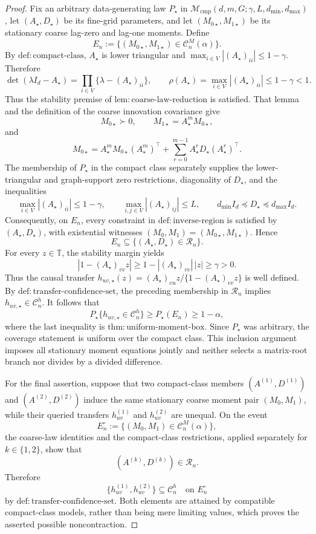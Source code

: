 \documentclass{article}
\begin{document}
\begin{proof}
Fix an arbitrary data-generating law \(P_\star\) in
\(\mathcal M_{\mathrm{cmp}}(d,m,G;\gamma,L,d_{\min},d_{\max})\), let
\((A_\star,D_\star)\) be its fine-grid parameters, and let
\((M_{0\star},M_{1\star})\) be its stationary coarse lag-zero and lag-one
moments.  Define
\[
 E_n:=\{(M_{0\star},M_{1\star})\in\mathcal C_n^M(\alpha)\}.
\]
By \(\mathrm{def{:}compact\mbox{-}class}\), \(A_\star\) is lower
triangular and
\(\max_{i\in V}|(A_\star)_{ii}|\leq 1-\gamma\).  Therefore
\[
 \det(\lambda I_d-A_\star)
 =\prod_{i\in V}\{\lambda-(A_\star)_{ii}\},
 \qquad
 \rho(A_\star)=\max_{i\in V}|(A_\star)_{ii}|
 \leq 1-\gamma<1.
\]
Thus the stability premise of
\(\mathrm{lem{:}coarse\mbox{-}law\mbox{-}reduction}\) is satisfied.
That lemma and the definition of the coarse innovation covariance give
\[
 M_{0\star}\succ0,
 \qquad
 M_{1\star}=A_\star^mM_{0\star},
\]
and
\[
 M_{0\star}
 =A_\star^mM_{0\star}(A_\star^m)^\top
  +\sum_{r=0}^{m-1}A_\star^rD_\star(A_\star^r)^\top.
\]
The membership of \(P_\star\) in the compact class separately supplies
the lower-triangular and graph-support zero restrictions, diagonality of
\(D_\star\), and the inequalities
\[
 \max_{i\in V}|(A_\star)_{ii}|\leq1-\gamma,
 \qquad
 \max_{i,j\in V}|(A_\star)_{ij}|\leq L,
 \qquad
 d_{\min}I_d\preceq D_\star\preceq d_{\max}I_d.
\]
Consequently, on \(E_n\), every constraint in
\(\mathrm{def{:}inverse\mbox{-}region}\) is satisfied by
\((A_\star,D_\star)\), with existential witnesses
\((M_0,M_1)=(M_{0\star},M_{1\star})\).  Hence
\[
 E_n\subseteq\{(A_\star,D_\star)\in\mathcal R_n\}.
\]
For every \(z\in\mathbb T\), the stability margin yields
\[
 |1-(A_\star)_{vv}z|
 \geq 1-|(A_\star)_{vv}|\,|z|
 \geq\gamma>0.
\]
Thus the causal transfer
\(h_{uv,\star}(z)=(A_\star)_{vu}z/
\{1-(A_\star)_{vv}z\}\) is well defined.  By
\(\mathrm{def{:}transfer\mbox{-}confidence\mbox{-}set}\), the preceding
membership in \(\mathcal R_n\) implies
\(h_{uv,\star}\in\mathcal C_n^h\).  It follows that
\[
 P_\star\{h_{uv,\star}\in\mathcal C_n^h\}
 \geq P_\star(E_n)
 \geq1-\alpha,
\]
where the last inequality is
\(\mathrm{thm{:}uniform\mbox{-}moment\mbox{-}box}\).  Since
\(P_\star\) was arbitrary, the coverage statement is uniform over the
compact class.  This inclusion argument imposes all stationary moment
equations jointly and neither selects a matrix-root branch nor divides by a
divided difference.

For the final assertion, suppose that two compact-class members
\((A^{(1)},D^{(1)})\) and \((A^{(2)},D^{(2)})\) induce the same stationary
coarse moment pair \((M_0,M_1)\), while their queried transfers
\(h_{uv}^{(1)}\) and \(h_{uv}^{(2)}\) are unequal.  On the event
\[
 E_n^\circ:=\{(M_0,M_1)\in\mathcal C_n^M(\alpha)\},
\]
the coarse-law identities and the compact-class restrictions, applied
separately for \(k\in\{1,2\}\), show that
\[
 (A^{(k)},D^{(k)})\in\mathcal R_n.
\]
Therefore
\[
 \{h_{uv}^{(1)},h_{uv}^{(2)}\}\subseteq\mathcal C_n^h
 \quad\text{on }E_n^\circ
\]
by \(\mathrm{def{:}transfer\mbox{-}confidence\mbox{-}set}\).  Both
elements are attained by compatible compact-class models, rather than being
mere limiting values, which proves the asserted possible noncontraction.
\end{proof}
\end{document}
